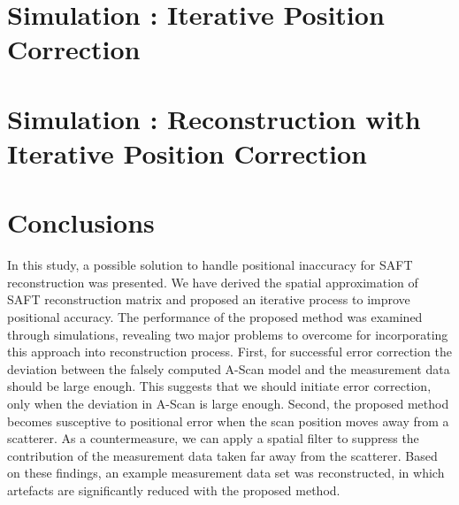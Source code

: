 \documentclass[10pt,twocolumn,a4paper,conference]{IEEEtran}
\begin{document}
\section{Simulation : Iterative Position Correction} \label{sec:simulation_GD} 
%
%
%
%
%
 

\section{Simulation : Reconstruction with Iterative Position Correction} \label{sec:simulation_reco} 
%
 


\section{Conclusions} \label{sec:conclusions}
In this study, a possible solution to handle positional inaccuracy for SAFT reconstruction was presented. We have derived the spatial approximation of SAFT reconstruction matrix and proposed an iterative process to improve positional accuracy. The performance of the proposed method was examined through simulations, revealing two major problems to overcome for incorporating this approach into reconstruction process. First, for successful error correction the deviation between the falsely computed A-Scan model and the measurement data should be large enough. This suggests that we should initiate error correction, only when the deviation in A-Scan is large enough. Second, the proposed method becomes susceptive to positional error when the scan position moves away from a scatterer. As a countermeasure, we can apply a spatial filter to suppress the contribution of the measurement data taken far away from the scatterer. Based on these findings, an example measurement data set was reconstructed, in which artefacts are significantly reduced with the proposed method. 


\small 
\end{document}

